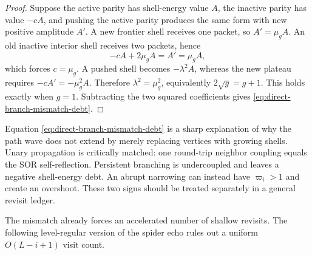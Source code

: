 \begin{proof}
Suppose the active parity has shell-energy value $A$, the inactive parity
has value $-cA$, and pushing the active parity produces the same form with
new positive amplitude $A'$.  A new frontier shell receives one packet, so
$A'=\mu_gA$.  An old inactive interior shell receives two packets, hence
\begin{equation*}
 -cA+2\mu_gA=A'=\mu_gA,
\end{equation*}
which forces $c=\mu_g$.  A pushed shell becomes $-\lambda^2A$, whereas the
new plateau requires
$-cA'=-\mu_g^2A$.  Therefore $\lambda^2=\mu_g^2$, equivalently
$2\sqrt g=g+1$.  This holds exactly when $g=1$.  Subtracting the two squared
coefficients gives \cref{eq:direct-branch-mismatch-debt}.
\end{proof}

Equation \cref{eq:direct-branch-mismatch-debt} is a sharp explanation of why
the path wave does not extend by merely replacing vertices with growing
shells.  Unary propagation is critically matched: one round-trip neighbor
coupling equals the SOR self-reflection.  Persistent branching is
undercoupled and leaves a negative shell-energy debt.  An abrupt narrowing
can instead have $\varpi_i>1$ and create an overshoot.  These two signs should
be treated separately in a general revisit ledger.

The mismatch already forces an accelerated number of shallow revisits.  The
following level-regular version of the spider echo rules out a uniform
$O(L-i+1)$ visit count.

